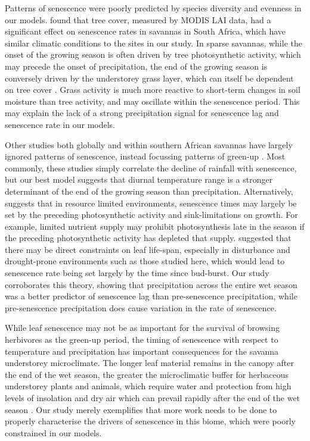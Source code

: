 \documentclass[11pt,a4paper]{article}
\begin{document}
Patterns of senescence were poorly predicted by species diversity and evenness in our models. \citet{Cho2017} found that tree cover, measured by MODIS LAI data, had a significant effect on senescence rates in savannas in South Africa, which have similar climatic conditions to the sites in our study. In sparse savannas, while the onset of the growing season is often driven by tree photosynthetic activity, which may precede the onset of precipitation, the end of the growing season is conversely driven by the understorey grass layer, which can itself be dependent on tree cover \citep{Cho2017, Guan2014}. Grass activity is much more reactive to short-term changes in soil moisture than tree activity, and may oscillate within the senescence period. This may explain the lack of a strong precipitation signal for senescence lag and senescence rate in our models. 

Other studies both globally and within southern African savannas have largely ignored patterns of senescence, instead focussing patterns of green-up \citep{Gallinat2015}. Most commonly, these studies simply correlate the decline of rainfall with senescence, but our best model suggests that diurnal temperature range is a stronger determinant of the end of the growing season than precipitation. Alternatively, \citet{Zani2020} suggests that in resource limited environments, senescence times may largely be set by the preceding photosynthetic activity and sink-limitations on growth. For example, limited nutrient supply may prohibit photosynthesis late in the season if the preceding photosynthetic activity has depleted that supply. \citet{Reich1992} suggested that there may be direct constraints on leaf life-span, especially in disturbance and drought-prone environments such as those studied here, which would lead to senescence rate being set largely by the time since bud-burst. Our study corroborates this theory, showing that precipitation across the entire wet season was a better predictor of senescence lag than pre-senescence precipitation, while pre-senescence precipitation does cause variation in the rate of senescence. 

While leaf senescence may not be as important for the survival of browsing herbivores as the green-up period, the timing of senescence with respect to temperature and precipitation has important consequences for the savanna understorey microclimate. The longer leaf material remains in the canopy after the end of the wet season, the greater the microclimatic buffer for herbaceous understorey plants and animals, which require water and protection from high levels of insolation and dry air which can prevail rapidly after the end of the wet season \citep{Guan2014}. Our study merely exemplifies that more work needs to be done to properly characterise the drivers of senescence in this biome, which were poorly constrained in our models.
\end{document}
